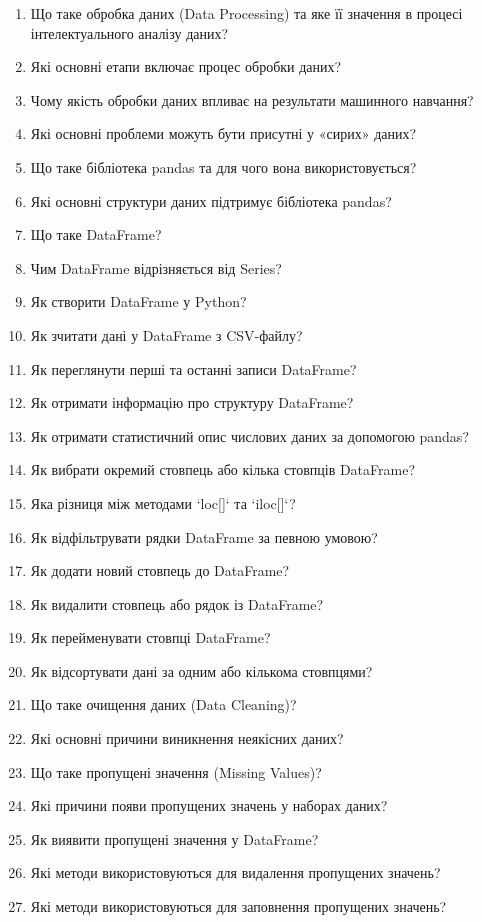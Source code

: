 \begin{enumerate}
\item Що таке обробка даних (Data Processing) та яке її значення в процесі інтелектуального аналізу даних?
\item Які основні етапи включає процес обробки даних?
\item Чому якість обробки даних впливає на результати машинного навчання?
\item Які основні проблеми можуть бути присутні у «сирих» даних?
\item Що таке бібліотека pandas та для чого вона використовується?
\item Які основні структури даних підтримує бібліотека pandas?
\item Що таке DataFrame?
\item Чим DataFrame відрізняється від Series?
\item Як створити DataFrame у Python?
\item Як зчитати дані у DataFrame з CSV-файлу?
\item Як переглянути перші та останні записи DataFrame?
\item Як отримати інформацію про структуру DataFrame?
\item Як отримати статистичний опис числових даних за допомогою pandas?
\item Як вибрати окремий стовпець або кілька стовпців DataFrame?
\item Яка різниця між методами `loc[]` та `iloc[]`?
\item Як відфільтрувати рядки DataFrame за певною умовою?
\item Як додати новий стовпець до DataFrame?
\item Як видалити стовпець або рядок із DataFrame?
\item Як перейменувати стовпці DataFrame?
\item Як відсортувати дані за одним або кількома стовпцями?
\item Що таке очищення даних (Data Cleaning)?
\item Які основні причини виникнення неякісних даних?
\item Що таке пропущені значення (Missing Values)?
\item Які причини появи пропущених значень у наборах даних?
\item Як виявити пропущені значення у DataFrame?
\item Які методи використовуються для видалення пропущених значень?
\item Які методи використовуються для заповнення пропущених значень?

\end{enumerate}
